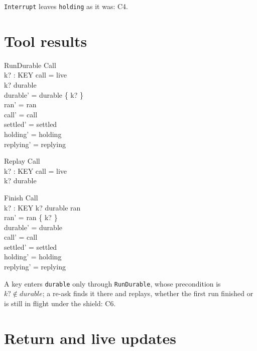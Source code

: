 \documentclass[a4paper,10pt,fleqn]{article}
\begin{document}
\texttt{Interrupt} leaves \texttt{holding} as it was: C4.

\section{Tool results}

\begin{schema}{RunDurable}
  \Delta Call \\
  k? : KEY
\where
  call = live \\
  k? \notin durable \\
  durable' = durable \cup \{ k? \} \\
  ran' = ran \\
  call' = call \\
  settled' = settled \\
  holding' = holding \\
  replying' = replying
\end{schema}

\begin{schema}{Replay}
  \Xi Call \\
  k? : KEY
\where
  call = live \\
  k? \in durable
\end{schema}

\begin{schema}{Finish}
  \Delta Call \\
  k? : KEY
\where
  k? \in durable \setminus ran \\
  ran' = ran \cup \{ k? \} \\
  durable' = durable \\
  call' = call \\
  settled' = settled \\
  holding' = holding \\
  replying' = replying
\end{schema}

A key enters \texttt{durable} only through \texttt{RunDurable}, whose
precondition is $k? \notin durable$; a re-ask finds it there and replays,
whether the first run finished or is still in flight under the shield: C6.

\section{Return and live updates}
\end{document}
